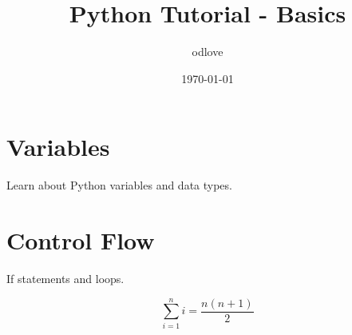 \documentclass{article}
\begin{document}
\title{Python Tutorial - Basics}
\author{odlove}
\date{\today}
\maketitle

\section{Variables}

Learn about Python variables and data types.

\section{Control Flow}

If statements and loops.

\[
\sum_{i=1}^{n} i = \frac{n(n+1)}{2}
\]
\end{document}
